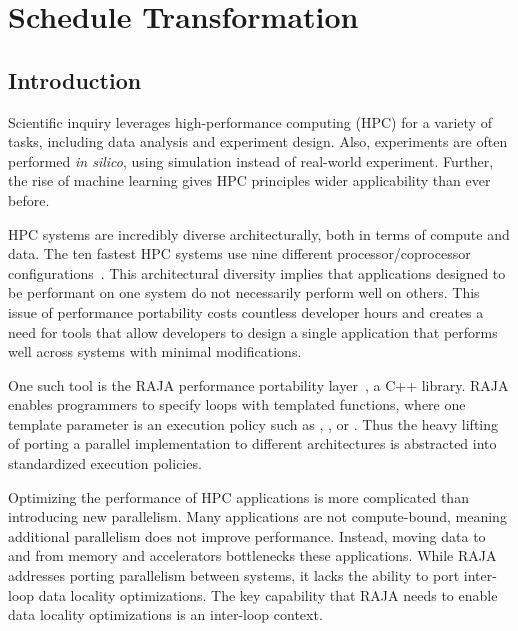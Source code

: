 
\chapter{Schedule Transformation}

\section{Introduction}

Scientific inquiry leverages high-performance computing (HPC) for a variety of
tasks, including data analysis and experiment design. 
Also, experiments are often performed \textit{in silico}, using 
simulation instead of real-world experiment.
Further, the rise of machine learning gives HPC principles wider
applicability than ever before.

HPC systems are incredibly diverse architecturally, 
both in terms of compute and data.
The ten fastest HPC systems use nine different processor/coprocessor
configurations~\cite{top500}.
This architectural diversity implies that applications designed to be
performant on one system do not necessarily perform well on others.
This issue of performance portability costs countless developer hours and
creates a need for tools that allow developers to design a single application
that performs well across systems with minimal modifications.

One such tool is the RAJA performance portability layer~\cite{RAJA}, a C++ library.
RAJA enables programmers to specify loops with templated functions,
where one template parameter is an execution policy such as 
, , or .
Thus the heavy lifting of porting a parallel implementation to different 
architectures is abstracted into standardized execution policies.

Optimizing the performance of HPC applications is more complicated than introducing new parallelism.
Many applications are not compute-bound, meaning additional parallelism does not improve performance. 
Instead, moving data to and from memory and accelerators bottlenecks these applications. 
While RAJA addresses porting parallelism between systems, it
lacks the ability to port inter-loop data locality optimizations.
The key capability that RAJA needs to enable data locality optimizations is
an inter-loop context.

